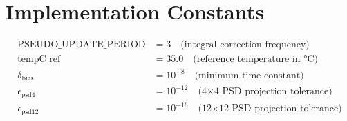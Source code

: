 \documentclass{article}
\begin{document}
\section{Implementation Constants}

\begin{align*}
\text{PSEUDO\_UPDATE\_PERIOD} &= 3 \quad \text{(integral correction frequency)} \\
\text{tempC\_ref} &= 35.0 \quad \text{(reference temperature in °C)} \\
\delta_{\text{bias}} &= 10^{-8} \quad \text{(minimum time constant)} \\
\epsilon_{\text{psd4}} &= 10^{-12} \quad \text{(4×4 PSD projection tolerance)} \\
\epsilon_{\text{psd12}} &= 10^{-16} \quad \text{(12×12 PSD projection tolerance)}
\end{align*}
\end{document}
